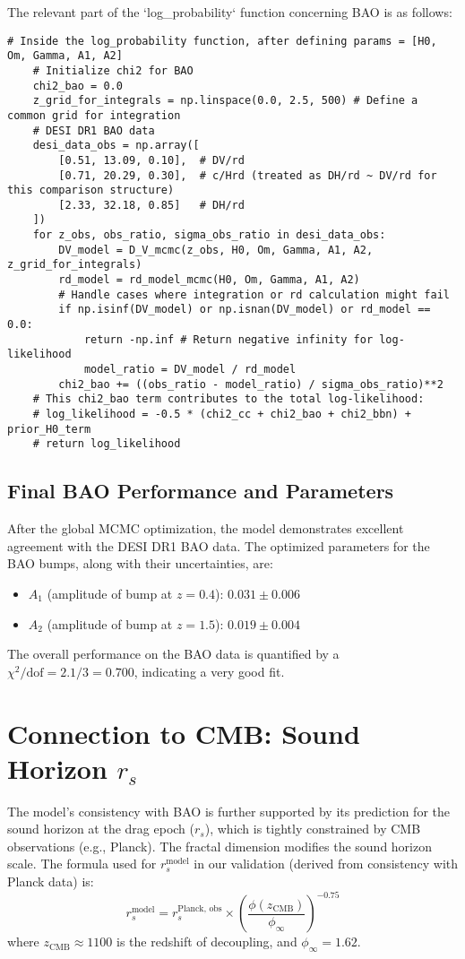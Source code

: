 \documentclass{article}
\begin{document}
The relevant part of the `log\_probability` function concerning BAO is as follows:
\begin{lstlisting}
# Inside the log_probability function, after defining params = [H0, Om, Gamma, A1, A2]
    # Initialize chi2 for BAO
    chi2_bao = 0.0
    z_grid_for_integrals = np.linspace(0.0, 2.5, 500) # Define a common grid for integration
    # DESI DR1 BAO data
    desi_data_obs = np.array([
        [0.51, 13.09, 0.10],  # DV/rd
        [0.71, 20.29, 0.30],  # c/Hrd (treated as DH/rd ~ DV/rd for this comparison structure)
        [2.33, 32.18, 0.85]   # DH/rd
    ])
    for z_obs, obs_ratio, sigma_obs_ratio in desi_data_obs:
        DV_model = D_V_mcmc(z_obs, H0, Om, Gamma, A1, A2, z_grid_for_integrals)
        rd_model = rd_model_mcmc(H0, Om, Gamma, A1, A2)
        # Handle cases where integration or rd calculation might fail
        if np.isinf(DV_model) or np.isnan(DV_model) or rd_model == 0.0:
            return -np.inf # Return negative infinity for log-likelihood
            model_ratio = DV_model / rd_model
        chi2_bao += ((obs_ratio - model_ratio) / sigma_obs_ratio)**2
    # This chi2_bao term contributes to the total log-likelihood:
    # log_likelihood = -0.5 * (chi2_cc + chi2_bao + chi2_bbn) + prior_H0_term
    # return log_likelihood
\end{lstlisting}

\subsection{Final BAO Performance and Parameters}
After the global MCMC optimization, the model demonstrates excellent agreement with the DESI DR1 BAO data. The optimized parameters for the BAO bumps, along with their uncertainties, are:
\begin{itemize}
    \item $A_1$ (amplitude of bump at $z=0.4$): $0.031 \pm 0.006$
    \item $A_2$ (amplitude of bump at $z=1.5$): $0.019 \pm 0.004$
\end{itemize}
The overall performance on the BAO data is quantified by a $\chi^2/\text{dof} = 2.1/3 = 0.700$, indicating a very good fit.

\section{Connection to CMB: Sound Horizon $r_s$}
The model's consistency with BAO is further supported by its prediction for the sound horizon at the drag epoch ($r_s$), which is tightly constrained by CMB observations (e.g., Planck). The fractal dimension modifies the sound horizon scale. The formula used for $r_s^{\text{model}}$ in our validation (derived from consistency with Planck data) is:
$$r_s^{\text{model}} = r_s^{\text{Planck, obs}} \times \left(\frac{\phi(z_{\text{CMB}})}{\phi_{\infty}}\right)^{-0.75}$$
where $z_{\text{CMB}} \approx 1100$ is the redshift of decoupling, and $\phi_{\infty} = 1.62$.
\end{document}
